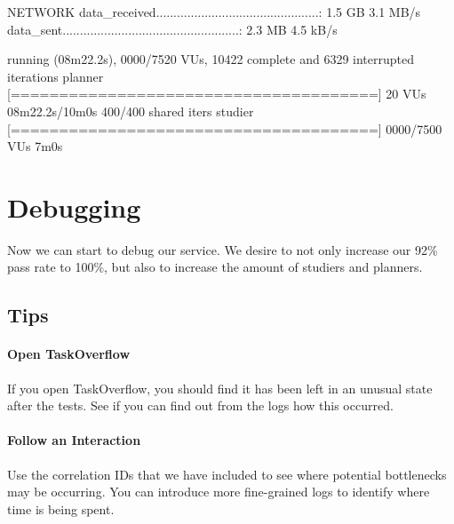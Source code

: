 \documentclass{csse4400}
\begin{document}
\begin{code}[language=bash,numbers=none]{}
    NETWORK
    data_received...............................................: 1.5 GB 3.1 MB/s
    data_sent...................................................: 2.3 MB 4.5 kB/s




running (08m22.2s), 0000/7520 VUs, 10422 complete and 6329 interrupted iterations
planner   [======================================] 20 VUs         08m22.2s/10m0s  400/400 shared iters
studier   [======================================] 0000/7500 VUs  7m0s
\end{code}


\section{Debugging}

Now we can start to debug our service.
We desire to not only increase our 92\% pass rate to 100\%,
but also to increase the amount of studiers and planners.

\subsection{Tips}

\paragraph{Open TaskOverflow}
If you open TaskOverflow,
you should find it has been left in an unusual state after the tests.
See if you can find out from the logs how this occurred.

\paragraph{Follow an Interaction}
Use the correlation IDs that we have included to see where potential bottlenecks may be occurring.
You can introduce more fine-grained logs to identify where time is being spent.





\end{document}
